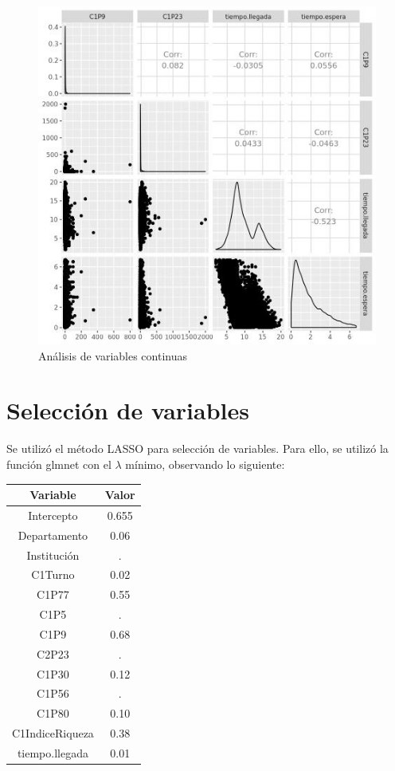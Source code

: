 \documentclass{article}
\begin{document}
\begin{figure}
\includegraphics[width=\textwidth]{scatterplot.jpg}
\caption{Análisis de variables continuas}
\label{fig:scp1}
\end{figure}

\section{Selección de variables}
Se utilizó el método LASSO para selección de variables. Para ello, se utilizó la función glmnet con el $\lambda$ mínimo, observando lo siguiente:

\begin{center}
\begin{tabular}{cc}
\hline
Variable        & Valor \\ \hline
Intercepto      & 0.655 \\
Departamento    & 0.06  \\
Institución     & .     \\
C1Turno         & 0.02  \\
C1P77           & 0.55  \\
C1P5            & .     \\
C1P9            & 0.68  \\
C2P23           & .     \\
C1P30           & 0.12  \\
C1P56           & .     \\
C1P80           & 0.10  \\
C1IndiceRiqueza & 0.38  \\
tiempo.llegada  & 0.01  \\ \hline
\end{tabular}
\end{center}
\end{document}
